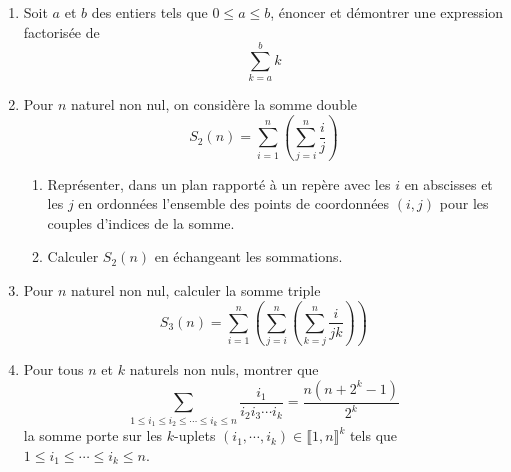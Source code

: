 \begin{enumerate}
  \item Soit $a$ et $b$ des entiers tels que $0\leq a \leq b$, énoncer et démontrer une expression factorisée de
\begin{displaymath}
  \sum_{k=a}^{b}k
\end{displaymath}

  \item Pour $n$ naturel non nul, on considère la somme double
\begin{displaymath}
  S_2(n) = \sum_{i=1}^{n}\left( \sum_{j=i}^{n}\frac{i}{j}\right) 
\end{displaymath}
\begin{enumerate}
  \item Représenter, dans un plan rapporté à un repère avec les $i$ en abscisses et les $j$ en ordonnées l'ensemble des points de coordonnées $(i,j)$ pour les couples d'indices de la somme.
  \item Calculer $S_2(n)$ en échangeant les sommations.
\end{enumerate}
\item Pour $n$ naturel non nul, calculer la somme triple 
\begin{displaymath}
S_3(n) =  \sum_{i=1}^{n}\left( \sum_{j=i}^{n}\left( \sum_{k=j}^{n} \frac{i}{jk}\right)\right) 
\end{displaymath}
\item Pour tous $n$ et $k$ naturels non nuls, montrer que
\begin{displaymath}
  \sum_{1\leq i_1 \leq i_2 \leq \cdots \leq i_k\leq n}\frac{i_1}{i_2 i_3 \cdots i_k}
  = \frac{n(n+2^k-1)}{2^k}
\end{displaymath}
la somme porte sur les $k$-uplets $(i_1,\cdots,i_k)\in \llbracket 1,n \rrbracket^k$ tels que $1\leq i_1 \leq \cdots \leq i_k \leq n$.
\end{enumerate}
